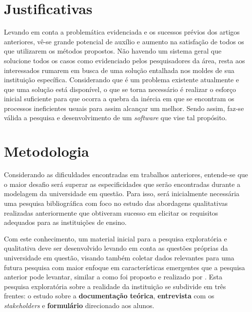 \section{Justificativas} \label{sec:Justificativas}      %

Levando em conta a problemática evidenciada e os sucessos prévios dos artigos anteriores, vê-se grande potencial de auxílio e aumento na satisfação de todos os que utilizarem os métodos propostos. Não havendo um sistema geral que solucione todos os casos como evidenciado pelos pesquisadores da área, resta aos interessados rumarem em busca de uma solução entalhada nos moldes de sua instituição específica. Considerando que é um problema existente atualmente e que uma solução está disponível, o que se torna necessário é realizar o esforço inicial suficiente para que ocorra a quebra da inércia em que se encontram os processos ineficientes usuais para assim alcançar um melhor. Sendo assim, faz-se válida a pesquisa e desenvolvimento de um \textit{software} que vise tal propósito.

\section{Metodologia} \label{sec:Metodologia}            %

Considerando as dificuldades encontradas em trabalhos anteriores, entende-se que o maior desafio será superar as especificidades que serão encontradas durante a modelagem da universidade em questão. Para isso, será inicialmente necessária uma pesquisa bibliográfica com foco no estudo das abordagens qualitativas realizadas anteriormente que obtiveram sucesso em elicitar os requisitos adequados para as instituições de ensino.

Com este conhecimento, um material inicial para a pesquisa exploratória e qualitativa deve ser desenvolvido levando em conta as questões próprias da universidade em questão, visando também coletar dados relevantes para uma futura pesquisa com maior enfoque em características emergentes que a pesquisa anterior pode levantar, similar a como foi proposto e realizado por . Esta pesquisa exploratória sobre a realidade da instituição se subdivide em três frentes: o estudo sobre a \textbf{documentação teórica}, \textbf{entrevista} com os \textit{stakeholders} e \textbf{formulário} direcionado aos alunos.

